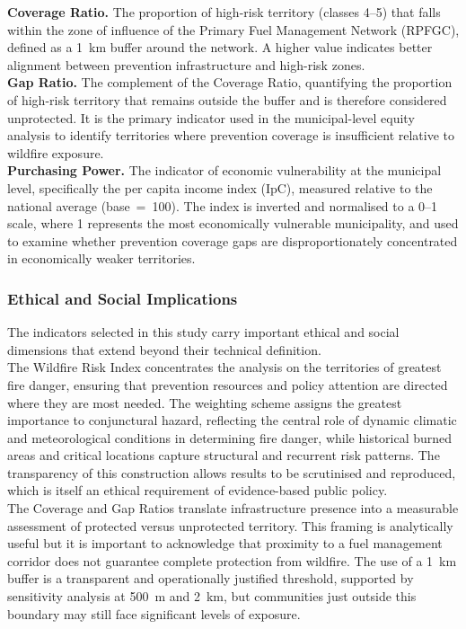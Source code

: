 \textbf{Coverage Ratio.} The proportion of high-risk territory (classes 4--5)
that falls within the zone of influence of the Primary Fuel Management Network
(RPFGC), defined as a 1~km buffer around the network. A higher value indicates
better alignment between prevention infrastructure and high-risk zones.\\

\textbf{Gap Ratio.} The complement of the Coverage Ratio, quantifying the proportion
of high-risk territory that remains outside the buffer and is therefore considered
unprotected. It is the primary indicator used in the municipal-level equity analysis
to identify territories where prevention coverage is insufficient relative to
wildfire exposure.\\

\textbf{Purchasing Power.} The indicator of economic vulnerability at the municipal
level, specifically the per capita income index (IpC),
measured relative to the national average (base~=~100).
The index is inverted and normalised to a 0--1 scale, where 1 represents the most
economically vulnerable municipality, and used to examine whether prevention coverage
gaps are disproportionately concentrated in economically weaker territories.


\subsubsection*{Ethical and Social Implications}


The indicators selected in this study carry important ethical and social
dimensions that extend beyond their technical definition.\\

The Wildfire Risk Index concentrates the analysis on the territories of
greatest fire danger, ensuring that prevention resources and policy attention
are directed where they are most needed. The weighting scheme assigns the
greatest importance to conjunctural hazard, reflecting the central role of
dynamic climatic and meteorological conditions in determining fire danger,
while historical burned areas and critical locations capture structural and
recurrent risk patterns. The transparency of this construction allows results
to be scrutinised and reproduced, which is itself an ethical requirement of
evidence-based public policy.\\

The Coverage and Gap Ratios translate infrastructure presence into a measurable
assessment of protected versus unprotected territory. This framing is
analytically useful but it is important to acknowledge that proximity to a
fuel management corridor does not guarantee complete protection from wildfire.
The use of a 1~km buffer is a transparent and operationally justified threshold,
supported by sensitivity analysis at 500~m and 2~km, but communities just
outside this boundary may still face significant levels of exposure.\\

